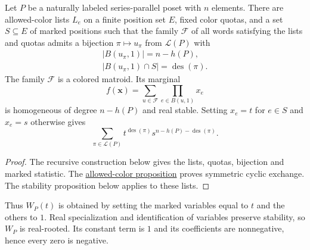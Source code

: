 \begin{theorem}
Let $P$ be a naturally labeled series-parallel poset with $n$ elements.
There are allowed-color lists $L_e$ on a finite position set $E$, fixed
color quotas, and a set $S\subseteq E$ of marked positions such that the
family $\mathcal F$ of all words satisfying the lists and quotas admits
a bijection $\pi\mapsto u_\pi$ from $\mathcal L(P)$ with
\[
 \begin{gathered}
 |B(u_\pi,1)|=n-h(P),\\
 |B(u_\pi,1)\cap S|=\operatorname{des}(\pi).
 \end{gathered}
\]
The family $\mathcal F$ is a colored matroid. Its marginal
\[
 f(\mathbf x)=\sum_{u\in\mathcal F}\prod_{e\in B(u,1)}x_e
\]
is homogeneous of degree $n-h(P)$ and real stable. Setting $x_e=t$ for
$e\in S$ and $x_e=s$ otherwise gives
\[
 \sum_{\pi\in\mathcal L(P)}
 t^{\operatorname{des}(\pi)}s^{n-h(P)-\operatorname{des}(\pi)}.
\]
\end{theorem}

\begin{proof}
The recursive construction below gives the lists, quotas, bijection and
marked statistic. The \href{constructions.htm#allowedColors}{allowed-color
proposition} proves symmetric cyclic exchange. The stability proposition
below applies to these lists.
\end{proof}

Thus $W_P(t)$ is obtained by setting the marked variables equal to $t$
and the others to $1$. Real specialization and identification of variables
preserve stability, so $W_P$ is real-rooted. Its constant term is $1$ and
its coefficients are nonnegative, hence every zero is negative.

